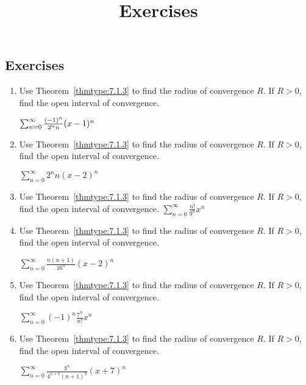 \documentclass{ximera}
\title{Exercises} \license{CC BY-NC-SA 4.0}
\begin{document}
\begin{abstract}
\end{abstract}
\maketitle

\begin{onlineOnly}
\section*{Exercises}
\end{onlineOnly}


\begin{problem}\label{exer:7.1.1}
\begin{enumerate}

\item Use Theorem~\ref{thmtype:7.1.3} to find the radius of convergence $R$. If $R>0$, find the open interval of convergence.

$\sum_{n=0}^\infty {(-1)^n\over2^nn}(x-1)^n$

\item Use Theorem~\ref{thmtype:7.1.3} to find the radius of convergence $R$. If $R>0$, find the open interval of convergence.

$\sum_{n=0}^\infty 2^nn(x-2)^n$

\item Use Theorem~\ref{thmtype:7.1.3} to find the radius of convergence $R$. If $R>0$, find the open interval of convergence.
$\sum_{n=0}^\infty \frac{n!}{9^n}x^n$

\item Use Theorem~\ref{thmtype:7.1.3} to find the radius of convergence $R$. If $R>0$, find the open interval of convergence.

$\sum_{n=0}^\infty\frac{n(n+1)}{16^n}(x-2)^n$

\item Use Theorem~\ref{thmtype:7.1.3} to find the radius of convergence $R$. If $R>0$, find the open interval of convergence.

$\sum_{n=0}^\infty (-1)^n\frac{7^n}{n!}x^n$

\item Use Theorem~\ref{thmtype:7.1.3} to find the radius of convergence $R$. If $R>0$, find the open interval of convergence.

$\sum_{n=0}^\infty \frac{3^n}{4^{n+1}(n+1)^2}(x+7)^n$
\end{enumerate}
\end{problem}
\end{document}
